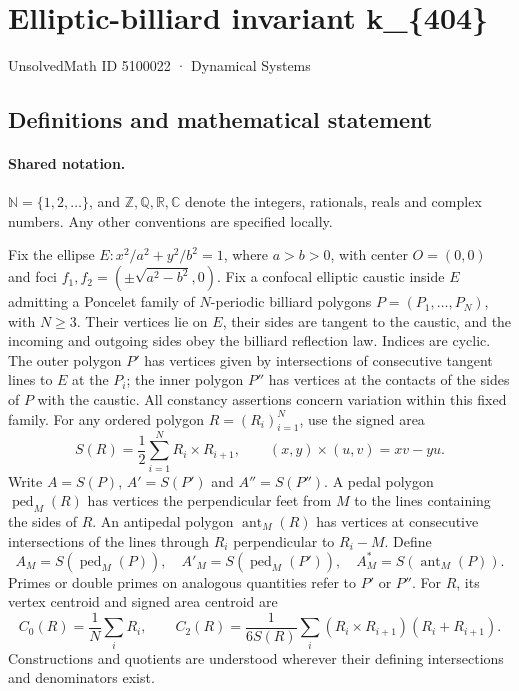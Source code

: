 \documentclass[11pt]{article}
\begin{document}
\setcounter{section}{5100021}
\section{Elliptic-billiard invariant k\_\{404\}}\label{5100022}
{\small\sffamily UnsolvedMath ID 5100022 · Dynamical Systems}
\subsection{Definitions and mathematical statement}

\paragraph{Shared notation.}$\mathbb N=\{1,2,\ldots\}$, and $\mathbb Z,\mathbb Q,\mathbb R,\mathbb C$ denote the integers, rationals, reals and complex numbers. Any other conventions are specified locally.


Fix the ellipse $E:x^2/a^2+y^2/b^2=1$, where $a>b>0$, with center $O=(0,0)$ and foci $f_1,f_2=(\pm\sqrt{a^2-b^2},0)$. Fix a confocal elliptic caustic inside $E$ admitting a Poncelet family of $N$-periodic billiard polygons $P=(P_1,\ldots,P_N)$, with $N\geq3$. Their vertices lie on $E$, their sides are tangent to the caustic, and the incoming and outgoing sides obey the billiard reflection law. Indices are cyclic. The outer polygon $P'$ has vertices given by intersections of consecutive tangent lines to $E$ at the $P_i$; the inner polygon $P''$ has vertices at the contacts of the sides of $P$ with the caustic. All constancy assertions concern variation within this fixed family.
For any ordered polygon $R=(R_i)_{i=1}^N$, use the signed area
\[S(R)=\frac12\sum_{i=1}^N R_i\times R_{i+1},\qquad (x,y)\times(u,v)=xv-yu.\]
Write $A=S(P)$, $A'=S(P')$ and $A''=S(P'')$. A pedal polygon $\operatorname{ped}_M(R)$ has vertices the perpendicular feet from $M$ to the lines containing the sides of $R$. An antipedal polygon $\operatorname{ant}_M(R)$ has vertices at consecutive intersections of the lines through $R_i$ perpendicular to $R_i-M$. Define
\[A_M=S(\operatorname{ped}_M(P)),\quad A'_M=S(\operatorname{ped}_M(P')),\quad A_M^*=S(\operatorname{ant}_M(P)).\]
Primes or double primes on analogous quantities refer to $P'$ or $P''$. For $R$, its vertex centroid and signed area centroid are
\[C_0(R)=\frac1N\sum_i R_i,\qquad C_2(R)=\frac{1}{6S(R)}\sum_i(R_i\times R_{i+1})(R_i+R_{i+1}).\]
Constructions and quotients are understood wherever their defining intersections and denominators exist.
\end{document}
